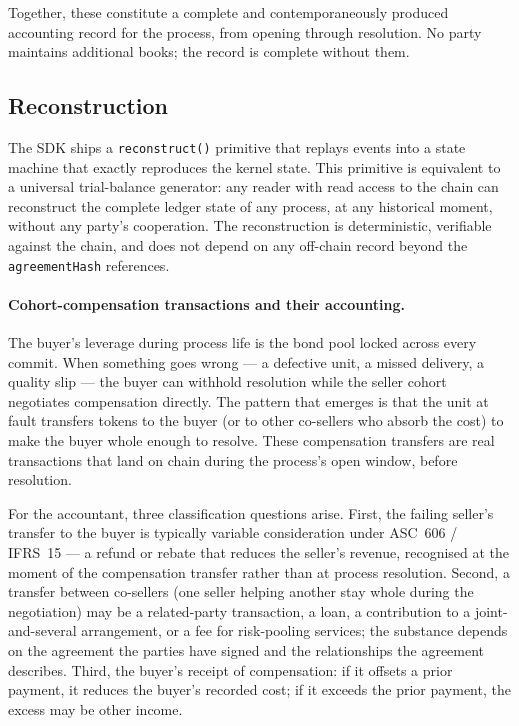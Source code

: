 \documentclass[11pt,a4paper]{article}
\theoremstyle{definition}
\theoremstyle{remark}
\begin{document}
Together, these constitute a complete and contemporaneously
produced accounting record for the process, from opening
through resolution. No party maintains additional books; the
record is complete without them.

\subsection{Reconstruction}

The SDK ships a \texttt{reconstruct()} primitive that replays
events into a state machine that exactly reproduces the kernel
state. This primitive is equivalent to a universal
trial-balance generator: any reader with read access to the
chain can reconstruct the complete ledger state of any
process, at any historical moment, without any party's
cooperation. The reconstruction is deterministic, verifiable
against the chain, and does not depend on any off-chain
record beyond the \texttt{agreementHash} references.

\paragraph{Cohort-compensation transactions and their accounting.}
The buyer's leverage during process life is the bond pool
locked across every commit. When something goes wrong --- a
defective unit, a missed delivery, a quality slip --- the
buyer can withhold resolution while the seller cohort
negotiates compensation directly. The pattern that emerges is
that the unit at fault transfers tokens to the buyer (or to
other co-sellers who absorb the cost) to make the buyer whole
enough to resolve. These compensation transfers are real
transactions that land on chain during the process's open
window, before resolution.

For the accountant, three classification questions arise.
First, the failing seller's transfer to the buyer is
typically variable consideration under ASC~606 /
IFRS~15 \citep{fasbasc606, ifrs2014ifrs15} --- a refund or
rebate that reduces the seller's revenue, recognised at the
moment of the compensation transfer rather than at process
resolution. Second, a transfer between co-sellers (one seller
helping another stay whole during the negotiation) may be a
related-party transaction, a loan, a contribution to a
joint-and-several arrangement, or a fee for risk-pooling
services; the substance depends on the agreement the parties
have signed and the relationships the agreement describes.
Third, the buyer's receipt of compensation: if it offsets a
prior payment, it reduces the buyer's recorded cost; if it
exceeds the prior payment, the excess may be other income.
\end{document}
